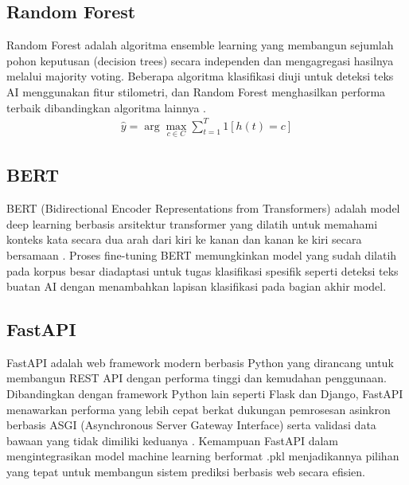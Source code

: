 \begin{enumerate}[label=\arabic*., leftmargin=*]
\end{enumerate}

\subsection{Random Forest}

Random Forest adalah algoritma ensemble learning yang membangun sejumlah pohon keputusan (decision trees) secara independen dan mengagregasi hasilnya melalui majority voting. Beberapa algoritma klasifikasi diuji untuk deteksi teks AI menggunakan fitur stilometri, dan Random Forest menghasilkan performa terbaik dibandingkan algoritma lainnya \cite{Of2026}.
\begin{equation}
\label{eq:25}
\begin{split}
\hat{y}=\arg{\max_{c\in C}{\sum_{t=1}^{T} {1}}}\left[h\left(t\right)=c\right]
\end{split}
\end{equation}

\subsection{BERT}

BERT (Bidirectional Encoder Representations from Transformers) adalah model deep learning berbasis arsitektur transformer yang dilatih untuk memahami konteks kata secara dua arah dari kiri ke kanan dan kanan ke kiri secara bersamaan \cite{H2025}. Proses fine-tuning BERT memungkinkan model yang sudah dilatih pada korpus besar diadaptasi untuk tugas klasifikasi spesifik seperti deteksi teks buatan AI dengan menambahkan lapisan klasifikasi pada bagian akhir model.

\subsection{FastAPI}

FastAPI adalah web framework modern berbasis Python yang dirancang untuk membangun REST API dengan performa tinggi dan kemudahan penggunaan. Dibandingkan dengan framework Python lain seperti Flask dan Django, FastAPI menawarkan performa yang lebih cepat berkat dukungan pemrosesan asinkron berbasis ASGI (Asynchronous Server Gateway Interface) serta validasi data bawaan yang tidak dimiliki keduanya \cite{Lee2023}. Kemampuan FastAPI dalam mengintegrasikan model machine learning berformat .pkl menjadikannya pilihan yang tepat untuk membangun sistem prediksi berbasis web secara efisien.

